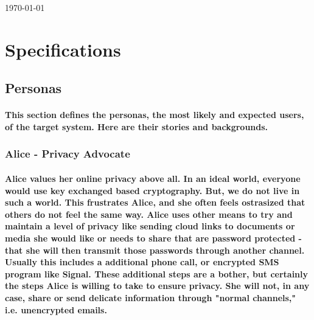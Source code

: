 \documentclass[12pt,a4paper]{article}
\begin{document}
\begin{titlepage}
	
	
	\vfill\vfill\vfill %
	
	{\large\today} %
	
	

	 
	
	\vfill %
	
\end{titlepage}

\tableofcontents
\newpage

\section{Specifications}
\subsection{Personas}
\paragraph{This section defines the personas, the most likely and expected users, of the target system. Here are their stories and backgrounds.}

\subsubsection{Alice - Privacy Advocate}

\paragraph{Alice values her online privacy above all. In an ideal world, everyone would use key exchanged based cryptography. But, we do not live in such a world. This frustrates Alice, and she often feels ostrasized that others do not feel the same way. Alice uses other means to try and maintain a level of privacy like sending cloud links to documents or media she would like or needs to share that are password protected - that she will then transmit those passwords through another channel. Usually this includes a additional phone call, or encrypted SMS program like Signal. These additional steps are a bother, but certainly the steps Alice is willing to take to ensure privacy. She will not, in any case, share or send delicate information through "normal channels," i.e. unencrypted emails.}
\end{document}
